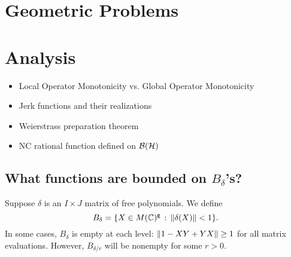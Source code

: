 \documentclass[oneside]{amsbook}
\numberwithin{equation}{section}
\begin{document}



\chapter{Geometric Problems}






















\chapter{Analysis}

\begin{itemize}
	\item Local Operator Monotonicity vs. Global Operator Monotonicity
	
	\item Jerk functions and their realizations
	
	\item Weierstrass preparation theorem
	
	\item NC rational function defined on $\mathcal{B}(\mathcal{H})$

\end{itemize}


\section{What functions are bounded on $B_{\delta}$'s?}

Suppose $\delta$ is an $I\times J$ matrix of free polynomials.
We define
\[
	B_\delta = {\left\{X\in M(\mathbb{C})^{\texttt{g}} \, :\, {\left\Vert\delta(X)\right\Vert}<1\right\}}.
\]
In some cases, $B_\delta$ is empty at each level: ${\left\Vert1 - XY + YX\right\Vert}\geq 1$ for all matrix evaluations.
However, $B_{\delta/r}$ will be nonempty for some $r>0$.
\end{document}
